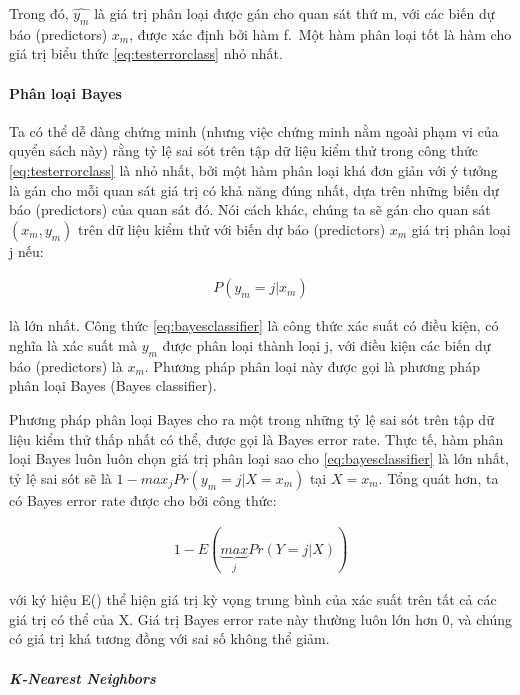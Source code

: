 \documentclass[
]{article}
\begin{document}
Trong đó, \(\hat{y_m}\) là giá trị phân loại được gán cho quan sát thứ m, với các biến dự báo (predictors) \(x_m\), được xác định bởi hàm f.~Một hàm phân loại tốt là hàm cho giá trị biểu thức \eqref{eq:testerrorclass} nhỏ nhất.

\hypertarget{phuxe2n-loux1ea1i-bayes}{%
\paragraph{Phân loại Bayes}\label{phuxe2n-loux1ea1i-bayes}}

Ta có thể dễ dàng chứng minh (nhưng việc chứng minh nằm ngoài phạm vi của quyển sách này) rằng tỷ lệ sai sót trên tập dữ liệu kiểm thử trong công thức \eqref{eq:testerrorclass} là nhỏ nhất, bởi một hàm phân loại khá đơn giản với ý tưởng là gán cho mỗi quan sát giá trị có khả năng đúng nhất, dựa trên những biến dự báo (predictors) của quan sát đó. Nói cách khác, chúng ta sẽ gán cho quan sát \((x_m, y_m)\) trên dữ liệu kiểm thử với biến dự báo (predictors) \(x_m\) giá trị phân loại j nếu:

\begin{align*}
P(y_m = j|x_m)
\label{eq:bayesclassifier}
\end{align*}

là lớn nhất. Công thức \eqref{eq:bayesclassifier} là công thức xác suất có điều kiện, có nghĩa là xác suất mà \(y_m\) được phân loại thành loại j, với điều kiện các biến dự báo (predictors) là \(x_m\). Phương pháp phân loại này được gọi là phương pháp phân loại Bayes (Bayes classifier).

Phương pháp phân loại Bayes cho ra một trong những tỷ lệ sai sót trên tập dữ liệu kiểm thử thấp nhất có thể, được gọi là Bayes error rate. Thực tế, hàm phân loại Bayes luôn luôn chọn giá trị phân loại sao cho \eqref{eq:bayesclassifier} là lớn nhất, tỷ lệ sai sót sẽ là \(1 - max_{j}Pr(y_m = j|X = x_m)\) tại \(X = x_m\). Tổng quát hơn, ta có Bayes error rate được cho bởi công thức:

\begin{align*}
1 - E(\underbrace{max}_{j} Pr(Y = j|X))
\label{eq:bayeserrorrate}
\end{align*}

với ký hiệu E() thể hiện giá trị kỳ vọng trung bình của xác suất trên tất cả các giá trị có thể của X. Giá trị Bayes error rate này thường luôn lớn hơn 0, và chúng có giá trị khá tương đồng với sai số không thể giảm.

\hypertarget{k-nearest-neighbors}{%
\subparagraph{K-Nearest Neighbors}\label{k-nearest-neighbors}}
\end{document}
